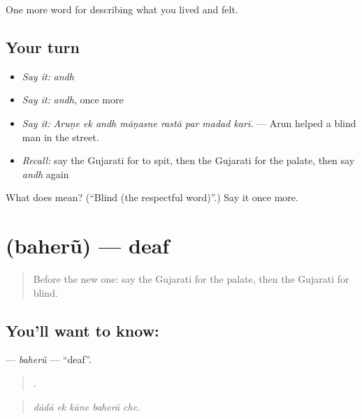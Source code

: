 \begin{grammarlens}[title={What you've built}]
One more word for describing what you lived and felt.
\end{grammarlens}

\subsection*{Your turn}
\begin{itemize}
\raggedright
  \item \emph{Say it:} \emph{andh}
  \item \emph{Say it:} \emph{andh}, once more
  \item \emph{Say it:} \emph{Aruṇe ek andh māṇasne rastā par madad karī.} — Arun helped a blind man in the street.
  \item \emph{Recall:} say the Gujarati for to spit, then the Gujarati for the palate, then say \emph{andh} again
\end{itemize}

\begin{tcolorbox}[breakable,colback=teal!4,colframe=teal!35!black,title={Before you move on}]
What does  mean? (\textquotedblleft{}Blind (the respectful word)\textquotedblright{}.) Say it once more.
\end{tcolorbox}
\section[\texorpdfstring{\gu{બહેરું} (baherũ)}{બહેરું (baherũ)}]{ (baherũ) — deaf}

\label{lesson:GU-C475-baheru}



\begin{quote}
Before the new one: say the Gujarati for the palate, then the Gujarati for blind.
\end{quote}

\subsection*{You'll want to know: }
\textbf{} — \emph{baherũ} — \textquotedblleft{}deaf\textquotedblright{}.

\begin{quote}
    .
\end{quote}

\begin{quote}
\emph{dādā ek kāne baherā che.}
\end{quote}

